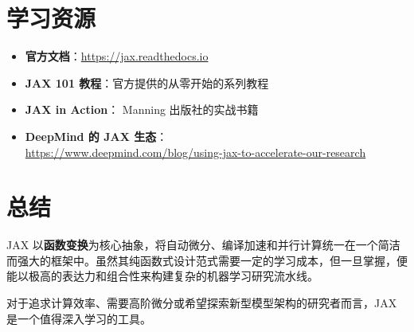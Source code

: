 \documentclass[12pt,a4paper]{article}
\begin{document}
\section{学习资源}

\begin{itemize}
    \item \textbf{官方文档}：\url{https://jax.readthedocs.io}
    \item \textbf{JAX 101 教程}：官方提供的从零开始的系列教程
    \item \textbf{JAX in Action}： Manning 出版社的实战书籍
    \item \textbf{DeepMind 的 JAX 生态}：\\ \url{https://www.deepmind.com/blog/using-jax-to-accelerate-our-research}
\end{itemize}

\section{总结}

JAX 以\textbf{函数变换}为核心抽象，将自动微分、编译加速和并行计算统一在一个简洁而强大的框架中。虽然其纯函数式设计范式需要一定的学习成本，但一旦掌握，便能以极高的表达力和组合性来构建复杂的机器学习研究流水线。

对于追求计算效率、需要高阶微分或希望探索新型模型架构的研究者而言，JAX 是一个值得深入学习的工具。
\end{document}
